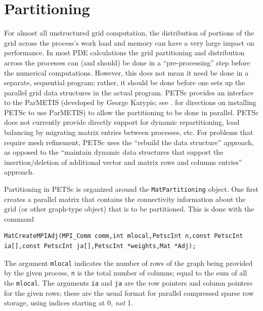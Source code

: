 \section{Partitioning}
\label{sec_partitioning}  

For almost all unstructured grid computation, the distribution of portions of
the grid across the process's work load and memory can have a very large
impact on performance. In most PDE calculations the grid partitioning and
distribution across the processes can (and should) be done in a ``pre-processing'' step
before the numerical computations. However, this does not mean it need be done
in a separate, sequential program; rather, it should be done before one sets up the
parallel grid data structures in the actual program. PETSc provides an interface to
the ParMETIS (developed by George Karypis; see \href{https://www.mcs.anl.gov/petsc/documentation/installation.html}{}.
for directions on installing PETSc to use ParMETIS) to allow the partitioning to be done in
parallel. PETSc does not currently provide directly support for dynamic
repartitioning, load balancing by migrating matrix entries between processes, etc.
For problems that require mesh refinement, PETSc uses the ``rebuild the data structure''
approach, as opposed to the ``maintain dynamic data structures that support the
insertion/deletion of additional vector and matrix rows and columns entries'' approach.

Partitioning in PETSc is organized around the \lstinline{MatPartitioning} object.
One first creates a parallel matrix that contains the connectivity information about the
grid (or other graph-type object) that is to be partitioned. This is done with the
command
\begin{lstlisting}
MatCreateMPIAdj(MPI_Comm comm,int mlocal,PetscInt n,const PetscInt ia[],const PetscInt ja[],PetscInt *weights,Mat *Adj);
\end{lstlisting}
The argument \lstinline{mlocal} indicates the number of rows of the graph being provided
by the given process, \lstinline{n} is the total number of columns; equal to the
sum of all the \lstinline{mlocal}. The arguments \lstinline{ia} and \lstinline{ja} are the row pointers
and column pointers for the given rows; these are the usual format for parallel
compressed sparse row storage, using indices starting at 0, {\em not} 1.

